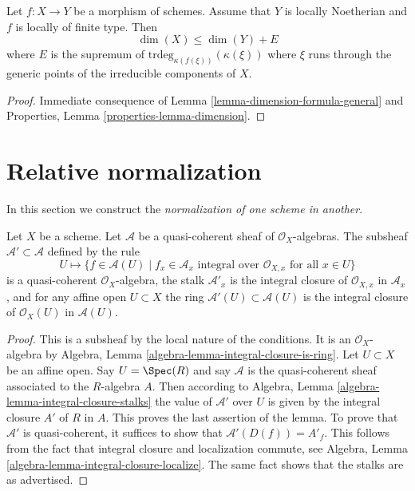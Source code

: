 \begin{lemma}
\label{lemma-alteration-dimension-general}
Let $f : X \to Y$ be a morphism of schemes. Assume that
$Y$ is locally Noetherian and $f$ is locally of finite type.
Then
$$
\dim(X) \leq \dim(Y) + E
$$
where $E$ is the supremum of $\text{trdeg}_{\kappa(f(\xi))}(\kappa(\xi))$
where $\xi$ runs through the generic points of the irreducible components
of $X$.
\end{lemma}

\begin{proof}
Immediate consequence of Lemma \ref{lemma-dimension-formula-general}
and Properties, Lemma \ref{properties-lemma-dimension}.
\end{proof}








\section{Relative normalization}
\label{section-normalization-X-in-Y}

\noindent
In this section we construct the {\it normalization of one scheme in another}.

\begin{lemma}
\label{lemma-integral-closure}
Let $X$ be a scheme. Let $\mathcal{A}$ be a quasi-coherent sheaf
of $\mathcal{O}_X$-algebras. The subsheaf $\mathcal{A}' \subset \mathcal{A}$
defined by the rule
$$
U \longmapsto \{f \in \mathcal{A}(U) \mid
f_x \in \mathcal{A}_x \text{ integral over } \mathcal{O}_{X, x}
\text{ for all }x \in U\}
$$
is a quasi-coherent $\mathcal{O}_X$-algebra, the stalk $\mathcal{A}'_x$
is the integral closure of $\mathcal{O}_{X, x}$ in $\mathcal{A}_x$, and
for any affine open $U \subset X$ the ring
$\mathcal{A}'(U) \subset \mathcal{A}(U)$ is
the integral closure of $\mathcal{O}_X(U)$ in $\mathcal{A}(U)$.
\end{lemma}

\begin{proof}
This is a subsheaf by the local nature of the conditions.
It is an $\mathcal{O}_X$-algebra by
Algebra, Lemma \ref{algebra-lemma-integral-closure-is-ring}.
Let $U \subset X$ be an affine open. Say $U = \Spec(R)$
and say $\mathcal{A}$ is the quasi-coherent sheaf associated to
the $R$-algebra $A$. Then according to
Algebra, Lemma \ref{algebra-lemma-integral-closure-stalks}
the value of $\mathcal{A}'$ over $U$ is given by the integral
closure $A'$ of $R$ in $A$. This proves the last assertion of
the lemma. To prove that $\mathcal{A}'$ is quasi-coherent, it
suffices to show that $\mathcal{A}'(D(f)) = A'_f$. This follows
from the fact that integral closure and localization commute, see
Algebra, Lemma \ref{algebra-lemma-integral-closure-localize}.
The same fact shows that the stalks are as advertised.
\end{proof}

